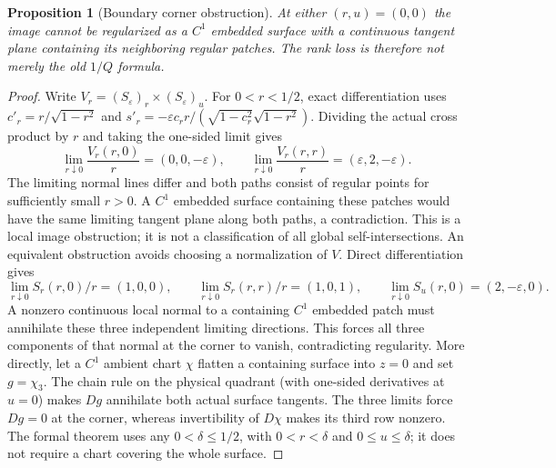 \documentclass[11pt,a4paper]{article}
\newtheorem{proposition}[theorem]{Proposition}
\theoremstyle{definition}\newtheorem{definition}[theorem]{Definition}
\theoremstyle{remark}\newtheorem{remark}[theorem]{Remark}
\begin{document}
\begin{proposition}[Boundary corner obstruction]\label{prop:corner}
At either $(r,u)=(0,0)$ the image cannot be regularized as a $C^1$ embedded
surface with a continuous tangent plane containing its neighboring regular
patches. The rank loss is therefore not merely the old $1/Q$ formula.
\end{proposition}
\begin{proof}
Write $V_r=(S_\varepsilon)_r\times(S_\varepsilon)_u$.
For $0<r<1/2$, exact differentiation uses
$c'_r=r/\sqrt{1-r^2}$ and
$s'_r=-\varepsilon c_r r/(\sqrt{1-c_r^2}\sqrt{1-r^2})$.
Dividing the actual cross product by $r$ and taking the one-sided limit gives
\[
 \lim_{r\downarrow0}\frac{V_r(r,0)}r=(0,0,-\varepsilon),\qquad
 \lim_{r\downarrow0}\frac{V_r(r,r)}r=(\varepsilon,2,-\varepsilon).
\]
The limiting normal lines differ and both paths consist of regular points
for sufficiently small $r>0$. A $C^1$ embedded surface containing these
patches would have the same limiting tangent plane along both paths, a
contradiction. This is a local image obstruction; it is not a classification
of all global self-intersections.
An equivalent obstruction avoids choosing a normalization of $V$.
Direct differentiation gives
\[
 \lim_{r\downarrow0}S_r(r,0)/r=(1,0,0),\qquad
 \lim_{r\downarrow0}S_r(r,r)/r=(1,0,1),\qquad
 \lim_{r\downarrow0}S_u(r,0)=(2,-\varepsilon,0).
\]
A nonzero continuous local normal to a containing $C^1$ embedded patch
must annihilate these three independent limiting directions. This forces
all three components of that normal at the corner to vanish, contradicting
regularity. More directly, let a $C^1$ ambient chart $\chi$ flatten a
containing surface into $z=0$ and set $g=\chi_3$. The chain rule on the
physical quadrant (with one-sided derivatives at $u=0$) makes $Dg$
annihilate both actual surface tangents. The three limits force $Dg=0$
at the corner, whereas invertibility of $D\chi$ makes its third row
nonzero. The formal theorem uses any $0<\delta\leq1/2$, with
$0<r<\delta$ and $0\leq u\leq\delta$; it does not require a chart
covering the whole surface.

\end{proof}
\end{document}

